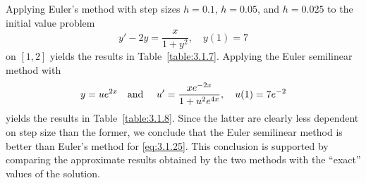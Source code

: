 \setcounter{example}{4}
\setcounter{equation}{24}
\begin{example}
  \label{example:3.1.5} \rm Applying Euler's method with step sizes $h=0.1$, $h=0.05$, and $h=0.025$
  to the initial value problem
  \begin{equation}
    \label{eq:3.1.25}y'-2y=\frac{x}{1+y^{2}},\quad y(1)=7
  \end{equation}
  on $[1,2]$ yields the results in Table~\ref{table:3.1.7}. Applying the Euler semilinear method
  with
  \[
    y=ue^{2x}\mbox{\quad and \quad}u'=\frac{xe^{-2x}}{1+u^{2}e^{4x}},\quad u(1)=7e^{-2}
  \]
  yields the results in Table~\ref{table:3.1.8}. Since the latter are clearly less dependent on step
  size than the former, we conclude that the Euler semilinear method is better than Euler's method
  for \eqref{eq:3.1.25}. This conclusion is supported by comparing the approximate results obtained
  by the two methods with the ``exact'' values of the solution.
\end{example}
\setcounter{table}{6}
